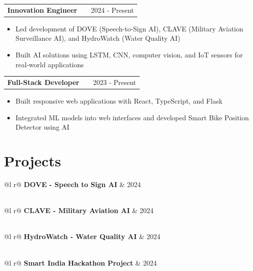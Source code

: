 \documentclass[a4paper,12pt]{article}
\makeatletter
\newenvironment{joblong}[2]
    {
    \begin{tabularx}{\linewidth}{@{}l X r@{}}
    \textbf{#1} & \hfill &  #2 \\[2pt]
    \end{tabularx}
    \begin{minipage}[t]{\linewidth}
    \begin{itemize}[nosep,after=\strut, leftmargin=1em, itemsep=2pt,label=--]
    }
    {
    \end{itemize}
    \end{minipage}    
    }
\makeatother
\begin{document}
\begin{joblong}{Innovation Engineer}{2024 - Present}
\item Led development of DOVE (Speech-to-Sign AI), CLAVE (Military Aviation Surveillance AI), and HydroWatch (Water Quality AI)
\item Built AI solutions using LSTM, CNN, computer vision, and IoT sensors for real-world applications
\end{joblong}

\begin{joblong}{Full-Stack Developer}{2023 - Present}
\item Built responsive web applications with React, TypeScript, and Flask
\item Integrated ML models into web interfaces and developed Smart Bike Position Detector using AI
\end{joblong}
  
\section{Projects}

\begin{tabularx}{\linewidth}{ @{}l r@{} }
\textbf{DOVE - Speech to Sign AI} & \hfill 2024 \\[2pt]
  \\
\end{tabularx}

\begin{tabularx}{\linewidth}{ @{}l r@{} }
\textbf{CLAVE - Military Aviation AI} & \hfill 2024 \\[2pt]
  \\
\end{tabularx}

\begin{tabularx}{\linewidth}{ @{}l r@{} }
\textbf{HydroWatch - Water Quality AI} & \hfill 2024 \\[2pt]
  \\
\end{tabularx}

\begin{tabularx}{\linewidth}{ @{}l r@{} }
\textbf{Smart India Hackathon Project} & \hfill 2024 \\[2pt]
  \\
\end{tabularx}
\end{document}
